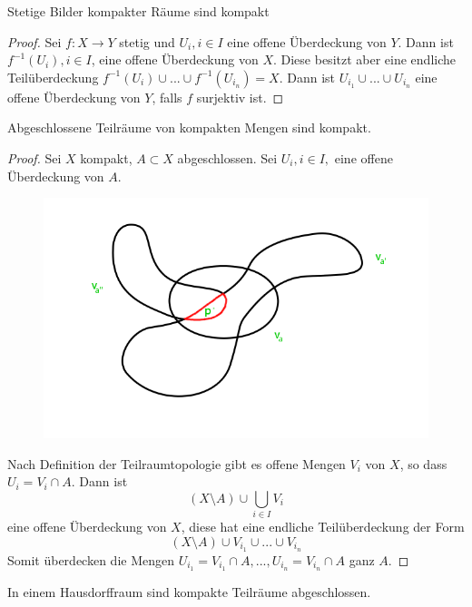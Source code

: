 \documentclass[a4paper,10pt]{scrartcl}
\begin{document}
\begin{st}\label{thm:6.6}
 Stetige Bilder kompakter Räume sind kompakt
\end{st}
\begin{proof}
Sei $f:X\to Y$ stetig und $U_i, i\in I$ eine offene Überdeckung von $Y$. Dann ist $f^{-1}(U_i),i\in I$, eine offene Überdeckung von $X$. Diese besitzt aber eine endliche Teilüberdeckung $f^{-1}(U_i)\cup ...\cup f^{-1}(U_{i_n})=X$. Dann ist $U_{i_1}\cup ...\cup U_{i_n}$ eine offene Überdeckung von $Y$, falls $f$ surjektiv ist.
\end{proof}
\begin{st*}
 Abgeschlossene Teilräume von kompakten Mengen sind kompakt.
\end{st*}
\begin{proof}
 Sei $X$ kompakt, $A\subset X$ abgeschlossen. Sei $U_i, i\in I,$ eine offene Überdeckung von $A$.
\begin{figure}[h]
\includegraphics[scale=0.5]{fig27.png}
\end{figure}
Nach Definition der Teilraumtopologie gibt es offene Mengen $V_i$ von $X$, so dass $U_i=V_i\cap A$. Dann ist 
\[
 (X\setminus A) \cup \bigcup_{i\in I} V_i
\]
eine offene Überdeckung von $X$, diese hat eine endliche Teilüberdeckung der Form 
\[
(X\setminus A)\cup V_{i_1} \cup...\cup V_{i_n}
\]
Somit überdecken die Mengen $U_{i_1}=V_{i_1}\cap A, ..., U_{i_n}=V_{i_n}\cap A$ ganz $A$.
\end{proof}
\begin{st} \label{thm:6.7}
In einem Hausdorffraum sind kompakte Teilräume abgeschlossen.
\end{st}
\end{document}
